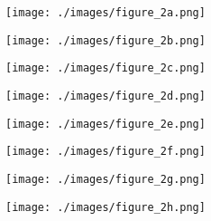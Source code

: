 \begin{figure*}[h]
    \centering
    \begin{subfigure}{.24\linewidth}
        \centering 
        \captionsetup{justification=centering}
        \texttt{[image: ./images/figure\_2a.png]}
        \caption{}
        \label{fig: RBF basic}
    \end{subfigure}
    \begin{subfigure}{.24\linewidth}
        \centering 
        \captionsetup{justification=centering}
        \texttt{[image: ./images/figure\_2b.png]}
        \caption{}
        \label{fig: RBF compound}
    \end{subfigure}
    \begin{subfigure}{.24\linewidth}
        \centering 
        \captionsetup{justification=centering}
        \texttt{[image: ./images/figure\_2c.png]}
        \caption{}
        \label{fig: RBF all}
    \end{subfigure}
    \begin{subfigure}{.24\linewidth}
        \centering 
        \captionsetup{justification=centering}
        \texttt{[image: ./images/figure\_2d.png]}
        \caption{}
        \label{fig: RBF misspec}
    \end{subfigure}
    \begin{subfigure}{.24\linewidth}
        \centering 
        \captionsetup{justification=centering}
        \texttt{[image: ./images/figure\_2e.png]}
        \caption{}
        \label{fig: PER basic}
    \end{subfigure}
    \begin{subfigure}{.24\linewidth}
        \centering 
        \captionsetup{justification=centering}
        \texttt{[image: ./images/figure\_2f.png]}
        \caption{}
        \label{fig: PER compound}
    \end{subfigure}
    \begin{subfigure}{.24\linewidth}
        \centering 
        \captionsetup{justification=centering}
        \texttt{[image: ./images/figure\_2g.png]}
        \caption{}
        \label{fig: PER all}
    \end{subfigure}
    \begin{subfigure}{.24\linewidth}
        \centering 
        \captionsetup{justification=centering}
        \texttt{[image: ./images/figure\_2h.png]}
        \caption{}
        \label{fig: PER misspec}

\end{subfigure}
\end{figure*}

